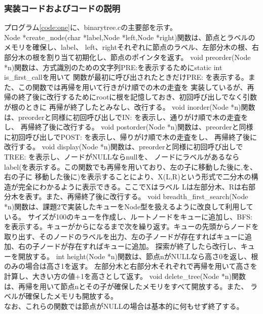 \documentclass{ltjsarticle}
\begin{document}
\subsubsection{実装コードおよびコードの説明}\label{subsubsec:実装コードおよびコードの説明1}
プログラム\ref{code:one}に、binarytree.cの主要部を示す。 \\ \indent
Node *create\_node(char *label,Node *left,Node *right)関数は、節点とラベルのメモリを確保し、label、
left、rightそれぞれに節点のラベル、左部分木の根、右部分木の根を割り当て初期化し、節点のポインタを返す。
void preorder(Node *n)関数は、方式識別のための文字列PRE:を表示するためにstatic int is\_first\_callを用いて
関数が最初に呼び出されたときだけPRE: を表示する。また、この関数では再帰を用いて行きがけ順での木の走査を
実装しているが、再帰の終了後に改行するためにrootに根を記憶しておき、初回呼び出しでなく引数が根のときに
再帰が終了したとみなし、改行する。
void inorder(Node *n)関数は、preorderと同様に初回呼び出しでIN: を表示し、通りがけ順で木の走査をし、
再帰終了後に改行する。
void postorder(Node *n)関数は、preorderと同様に初回呼び出しでPOST: を表示し、帰りがけ順で木の走査をし、
再帰終了後に改行する。
void display(Node *n)関数は、preorderと同様に初回呼び出しでTREE: を表示し、ノードがNULLならnullを、
ノードにラベルがあるならlabel(を表示する。この関数でも再帰を用いており、左の子に移動した後に,を、右の子に
移動した後に)を表示することにより、X(L,R)という形式で二分木の構造が完全にわかるように表示できる。ここでXはラベル
Lは左部分木、Rは右部分木を表す。また、再帰終了後に改行する。
void breadth\_first\_search(Node *n)関数は、課題2で実装したキューをNode型を扱えるように改良して利用している。
サイズが100のキューを作成し、ルートノードをキューに追加し、BFS: を表示する。キューがからになるまで次を繰り返す。キューの先頭からノードを
取り出す、そのノードのラベルを出力、左の子ノードが存在すればキューに追加、右の子ノードが存在すればキューに追加。
探索が終了したら改行し、キューを開放する。
int height(Node *n)関数は、節点nがNULLなら高さ0を返し、根のみの場合は高さ1を返す。
左部分木と右部分木それぞれで再帰を用いて高さを計算し、大きい方の値+1を高さとして返す。
void delete\_tree(Node *n)関数は、再帰を用いて節点nとその子が確保したメモリをすべて開放する。また、
ラベルが確保したメモリも開放する。\\
なお、これらの関数では節点がNULLの場合は基本的に何もせず終了する。
\end{document}
